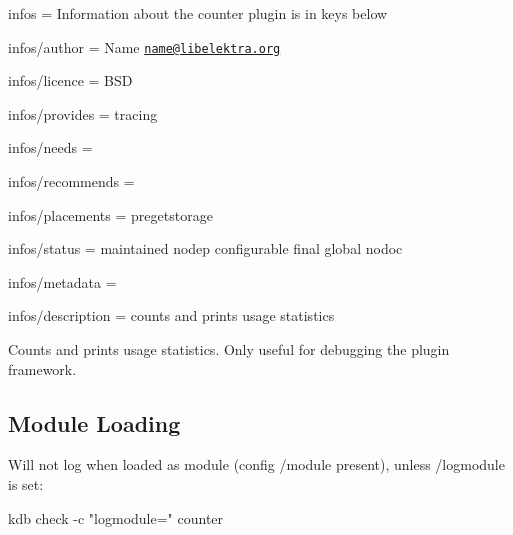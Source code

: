 
\begin{DoxyItemize}
\item infos = Information about the counter plugin is in keys below
\item infos/author = Name \href{mailto:name@libelektra.org}{\tt name@libelektra.\+org}
\item infos/licence = B\+S\+D
\item infos/provides = tracing
\item infos/needs =
\item infos/recommends =
\item infos/placements = pregetstorage
\item infos/status = maintained nodep configurable final global nodoc
\item infos/metadata =
\item infos/description = counts and prints usage statistics
\end{DoxyItemize}

Counts and prints usage statistics. Only useful for debugging the plugin framework.

\subsection*{Module Loading}

Will not log when loaded as module (config {\ttfamily /module} present), unless {\ttfamily /logmodule} is set\+: \begin{DoxyVerb}kdb check -c "logmodule=" counter\end{DoxyVerb}
 